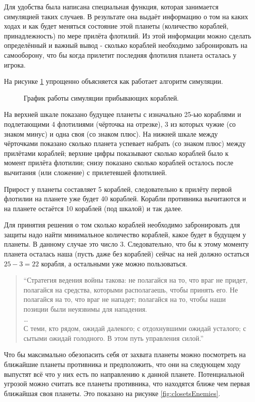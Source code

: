 \documentclass[12pt]{report}
\begin{document}
Для удобства была написана специальная функция, которая занимается симуляцией таких случаев. В результате она выдаёт информацию о том на каких ходах и как будет меняться состояние этой планеты (количество кораблей, принадлежность) по мере прилёта флотилий. Из этой информации можно сделать определённый и важный вывод - сколько кораблей необходимо забронировать на самооборону, что бы когда прилетит последняя флотилия планета осталась у игрока.

На рисунке \ref{fig:simulation} упрощенно объясняется как работает алгоритм симуляции. 

\begin{figure}[h]
	\centering
	
	\caption{График работы симуляции прибывающих кораблей.}
	\label{fig:simulation}
\end{figure}

На верхней шкале показано будущее планеты с изначально 25-ью кораблями и подлетающими 4 флотилиями (чёрточка на отрезке), 3 из которых чужие (со знаком минус) и одна своя (со знаком плюс). На нижней шкале между чёрточками показано сколько планета успевает набрать (со знаком плюс) между прилётами кораблей; верхние цифры показывают сколько кораблей было к момент прилёта флотилии; снизу показано сколько кораблей осталось после вычитания (или сложение) с прилетевшей флотилией.

Прирост у планеты составляет 5 кораблей, следовательно к прилёту первой флотилии на планете уже будет 40 кораблей.  Корабли противника вычитаются и на планете остаётся 10 кораблей (под шкалой) и так далее.

Для принятия решения о том сколько кораблей необходимо забронировать для защиты надо найти минимальное количество кораблей, какое будет в будущем у планеты. В данному случае это число 3. Следовательно, что бы к этому моменту планета осталась наша (пусть даже без кораблей) сейчас на ней должно остаться $25 - 3 = 22$ корабля, а остальными уже можно пользоваться.
\begin{quote}
``Стратегия ведения войны такова: не полагайся на то, что враг не придет, полагайся на средства, которыми располагаешь, чтобы принять его. Не полагайся на то, что враг не нападет; полагайся на то, чтобы наши позиции были неуязвимы для нападения. \\
\ldots\\
С теми, кто рядом, ожидай далекого; с отдохнувшими ожидай
усталого; с сытыми ожидай голодного. В этом путь управления силой.'' \\ \citep{tzu1971art}
\end{quote}
Что бы максимально обезопасить себя от захвата планеты можно посмотреть на ближайшие планеты противника и предположить, что они на следующем ходу выпустят всё что у них есть по направлению к данной планете. Потенциальной угрозой можно считать все планеты противника, что находятся ближе чем первая ближайшая своя планеты. Это показано на рисунке \ref{fig:closetsEnemies}.
\end{document}
